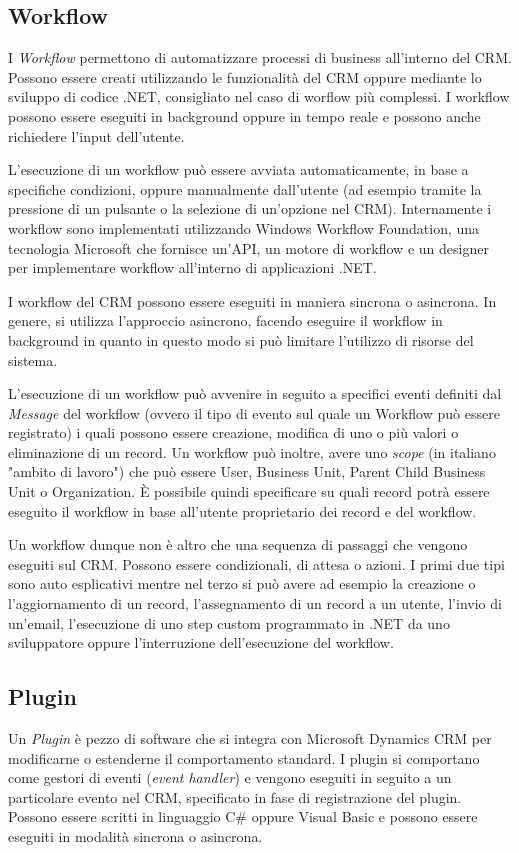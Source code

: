 \subsection{Workflow}
I \textit{Workflow} permettono di automatizzare processi di business all'interno del CRM. Possono essere creati utilizzando le funzionalità del CRM oppure mediante lo sviluppo di codice .NET, consigliato nel caso di worflow più complessi. I workflow possono essere eseguiti in background oppure in tempo reale e possono anche richiedere l'input dell'utente.

L'esecuzione di un workflow può essere avviata automaticamente, in base a specifiche condizioni, oppure manualmente dall'utente (ad esempio tramite la pressione di un pulsante o la selezione di un'opzione nel CRM). Internamente i workflow sono implementati utilizzando Windows Workflow Foundation, una tecnologia Microsoft che fornisce un'API, un motore di workflow e un designer per implementare workflow all'interno di applicazioni .NET.

I workflow del CRM possono essere eseguiti in maniera sincrona o asincrona. In genere, si utilizza l'approccio asincrono, facendo eseguire il workflow in background in quanto in questo modo si può limitare l'utilizzo di risorse del sistema.

L'esecuzione di un workflow può avvenire in seguito a specifici eventi definiti dal \textit{Message} del workflow (ovvero il tipo di evento sul quale un Workflow può essere registrato) i quali possono essere creazione, modifica di uno o più valori o eliminazione di un record. Un workflow può inoltre, avere uno \textit{scope} (in italiano "ambito di lavoro") che può essere User, Business Unit, Parent Child Business Unit o Organization. È possibile quindi specificare su quali record potrà essere eseguito il workflow in base all'utente proprietario dei record e del workflow.

Un workflow dunque non è altro che una sequenza di passaggi che vengono eseguiti sul CRM. Possono essere condizionali, di attesa o azioni. I primi due tipi sono auto esplicativi mentre nel terzo si può avere ad esempio la creazione o l'aggiornamento di un record, l'assegnamento di un record a un utente, l'invio di un'email, l'esecuzione di uno step custom programmato in .NET da uno sviluppatore oppure l'interruzione dell'esecuzione del workflow.

\subsection{Plugin}
Un \textit{Plugin} è pezzo di software che si integra con Microsoft Dynamics CRM per modificarne o estenderne il comportamento standard. I plugin si comportano come gestori di eventi (\textit{event handler}) e vengono eseguiti in seguito a un particolare evento nel CRM, specificato in fase di registrazione del plugin. Possono essere scritti in linguaggio C\# oppure Visual Basic e possono essere eseguiti in modalità sincrona o asincrona.


